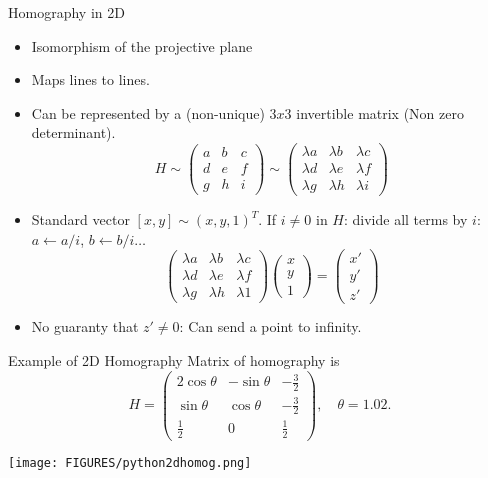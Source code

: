 \documentclass[9pt]{beamer}
\begin{document}
\begin{frame}[t]{Homography in 2D}
  \begin{itemize}
  \item Isomorphism of the projective plane
  \item Maps lines to lines.
  \item Can be represented by a (non-unique) $3x3$ invertible matrix (Non zero determinant).
    $$
    H \sim
    \begin{pmatrix}
      a & b & c\\
      d & e & f\\
      g & h & i
    \end{pmatrix}\sim
    \begin{pmatrix}
      \lambda a & \lambda b & \lambda c\\
      \lambda d & \lambda e & \lambda f\\
      \lambda g & \lambda h & \lambda i
    \end{pmatrix}
    $$
  \item Standard vector $[x,y]\sim (x,y,1)^T$. If $i\not=0$ in $H$: divide all terms by $i$: $a \leftarrow a/i$, $b\leftarrow b/i\dots$
    $$
    \begin{pmatrix}
      \lambda a & \lambda b & \lambda c\\
      \lambda d & \lambda e & \lambda f\\
      \lambda g & \lambda h & \lambda 1
    \end{pmatrix}
    \begin{pmatrix}
     x \\y\\1
    \end{pmatrix}
    =
    \begin{pmatrix}
      x'\\y'\\z'
    \end{pmatrix}
    $$
  \item No guaranty that $z'\not=0$: Can send a point to infinity. 
  \end{itemize}
\end{frame}


\begin{frame}[t]{Example of 2D Homography}
  Matrix of homography is 
  $$
  H =
  \begin{pmatrix}
    2\cos\theta& -\sin\theta& -\frac32\\
    \sin\theta&  \cos\theta& -\frac32\\
    \frac12 & 0 & \frac12
  \end{pmatrix},\quad \theta = 1.02.
  $$
  \begin{center}
    \texttt{[image: FIGURES/python2dhomog.png]}
  \end{center}
\end{frame}
\end{document}

